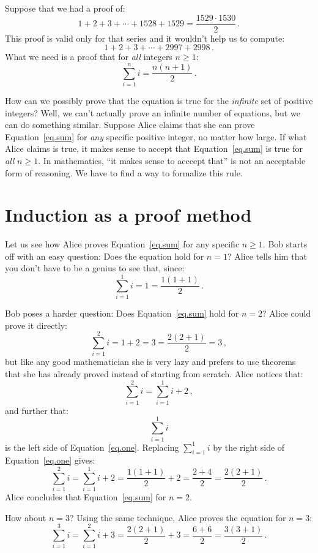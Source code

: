 \documentclass[11pt,a4paper]{report}
\begin{document}
Suppose that we had a proof of:
\[
1+2+3+\cdots+1528+1529=\frac{1529\cdot 1530}{2}\,.
\]
This proof is valid only for that series and it wouldn't help us to compute:
\[
1+2+3+\cdots+2997+2998\,.
\]
What we need is a proof that for \emph{all} integers $n\geq 1$:
\begin{equation}
\sum_{i=1}^n i = \frac{n(n+1)}{2}\,.\label{eq.sum}
\end{equation}

How can we possibly prove that the equation is true for the \emph{infinite} set of positive integers? Well, we can't actually prove an infinite number of equations, but we can do something similar. Suppose Alice claims that she can prove Equation~\ref{eq.sum} for \emph{any} specific positive integer, no matter how large. If what Alice claims is true, it makes sense to accept that Equation~\ref{eq.sum} is true for \emph{all} $n\geq 1$. In mathematics, ``it makes sense to acccept that'' is not an acceptable form of reasoning. We have to find a way to formalize this rule.

\section{Induction as a proof method}\label{s.rule}

Let us see how Alice proves Equation~\ref{eq.sum} for any specific $n\geq 1$. Bob starts off with an easy question: Does the equation hold for $n=1$? Alice tells him that you don't have to be a genius to see that, since:
\begin{equation}\label{eq.one}
\sum_{i=1}^1 i = 1 = \frac{1(1+1)}{2}\,.
\end{equation}

Bob poses a harder question: Does Equation~\ref{eq.sum} hold for $n=2$? Alice could prove it directly:
\[
\sum_{i=1}^2 i = 1 + 2 = 3 = \frac{2(2+1)}{2}=3\,,
\]
but like any good mathematician she is very lazy and prefers to use theorems that she has already proved instead of starting from scratch. Alice notices that:
\[
\sum_{i=1}^2 i = \sum_{i=1}^1 i + 2\,,
\]
and further that:
\[
\sum_{i=1}^1 i
\]
is the left side of Equation~\ref{eq.one}. Replacing $\sum_{i=1}^1 i$ by the right side of Equation~\ref{eq.one} gives:
\[
\sum_{i=1}^2 i = \sum_{i=1}^1 i +2 = \frac{1(1+1)}{2} + 2 = \frac{2 + 4}{2} = \frac{2(2+1)}{2}\,.
\]
Alice concludes that Equation~\ref{eq.sum} for $n=2$.

How about $n=3$? Using the same technique, Alice proves the equation for $n=3$:
\[
\sum_{i=1}^3 i = \sum_{i=1}^2 i + 3 = \frac{2(2+1)}{2} + 3 = \frac{6+6}{2} = \frac{3(3+1)}{2}\,.
\]
\end{document}
